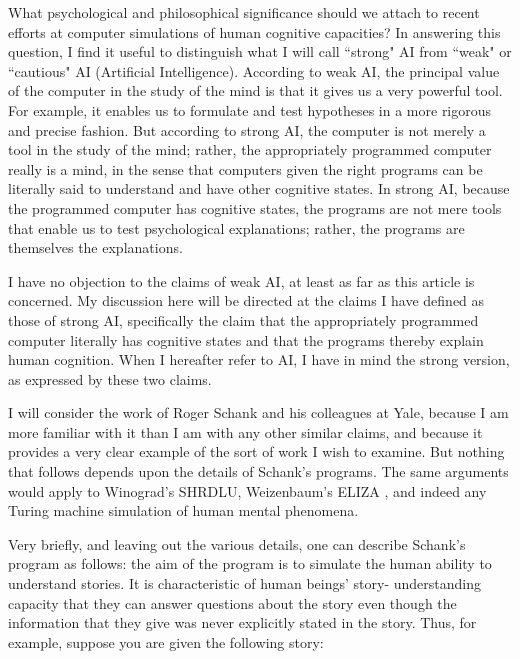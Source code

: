 What psychological and philosophical significance should we attach to recent efforts at computer simulations of
human cognitive capacities? In answering this question, I find it useful to distinguish what I will call ``strong" AI
from ``weak" or ``cautious" AI (Artificial Intelligence). According to weak AI, the principal value of the computer
in the study of the mind is that it gives us a very powerful tool. For example, it enables us to formulate and test
hypotheses in a more rigorous and precise fashion. But according to strong AI, the computer is not merely a
tool in the study of the mind; rather, the appropriately programmed computer really is a mind, in the sense that
computers given the right programs can be literally said to understand and have other cognitive states. In strong
AI, because the programmed computer has cognitive states, the programs are not mere tools that enable us to
test psychological explanations; rather, the programs are themselves the explanations.

I have no objection to the claims of weak AI, at least as far as this article is concerned. My discussion here will
be directed at the claims I have defined as those of strong AI, specifically the claim that the appropriately
programmed computer literally has cognitive states and that the programs thereby explain human cognition.
When I hereafter refer to AI, I have in mind the strong version, as expressed by these two claims.

I will consider the work of Roger Schank and his colleagues at Yale\autocite{Schank1}, because I am
more familiar with it than I am with any other similar claims, and because it provides a very clear example of the
sort of work I wish to examine. But nothing that follows depends upon the details of Schank's programs. The
same arguments would apply to Winograd's SHRDLU\autocite{Winograd1}, Weizenbaum's ELIZA \autocite{Weizen1}, and indeed any Turing machine simulation of human mental phenomena.

Very briefly, and leaving out the various details, one can describe Schank's program as follows: the aim of the
program is to simulate the human ability to understand stories. It is characteristic of human beings' story-
understanding capacity that they can answer questions about the story even though the information that they
give was never explicitly stated in the story. Thus, for example, suppose you are given the following story:

